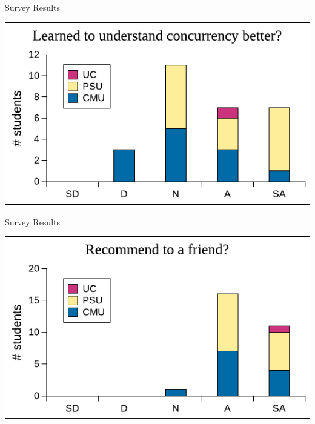 \documentclass[xcolor=dvipsnames]{beamer}
\begin{document}
\begin{frame}{Survey Results} %
	\begin{center}
		\includegraphics[width=\textwidth]{../survey8.pdf} %
	\end{center}
\end{frame}

\begin{frame}{Survey Results} %
	\begin{center}
		\includegraphics[width=\textwidth]{../survey10.pdf} %
	\end{center}
\end{frame}
\end{document}
